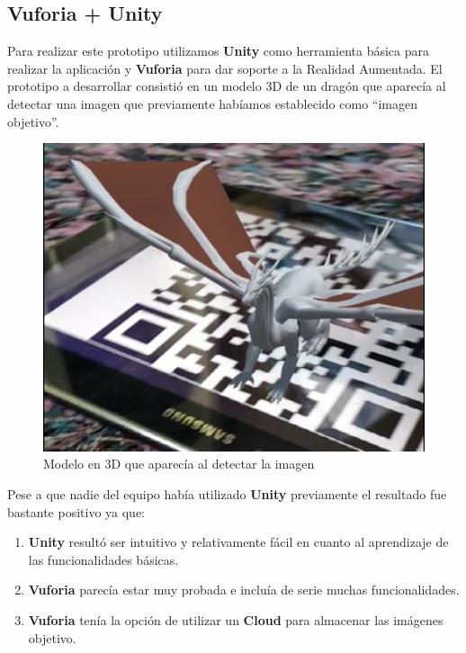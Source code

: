 \subsection{Vuforia + Unity} 
\label{makereference3.6.4}
\begin{flushleft}
    Para realizar este prototipo utilizamos \textbf{Unity} como herramienta básica para realizar la aplicación y \textbf{Vuforia} para dar soporte a la Realidad Aumentada.
    El prototipo a desarrollar consistió en un modelo 3D de un dragón que aparecía al detectar una imagen que previamente habíamos establecido como ``imagen objetivo''.
\end{flushleft}
    \begin{figure}[H]
        \centering
        \includegraphics[width=5in]{figures/prototipoUnity.jpg}
        \caption{Modelo en 3D que aparecía al detectar la imagen}
    \end{figure}
\begin{flushleft}
    Pese a que nadie del equipo había utilizado \textbf{Unity} previamente el resultado fue bastante positivo ya que:
    \begin{enumerate}
    \item \textbf{Unity} resultó ser intuitivo y relativamente fácil en cuanto al aprendizaje de las funcionalidades básicas.
    \item \textbf{Vuforia} parecía estar muy probada e incluía de serie muchas funcionalidades.
    \item \textbf{Vuforia} tenía la opción de utilizar un \textbf{Cloud} para almacenar las imágenes objetivo.
    \end{enumerate}
\end{flushleft}

